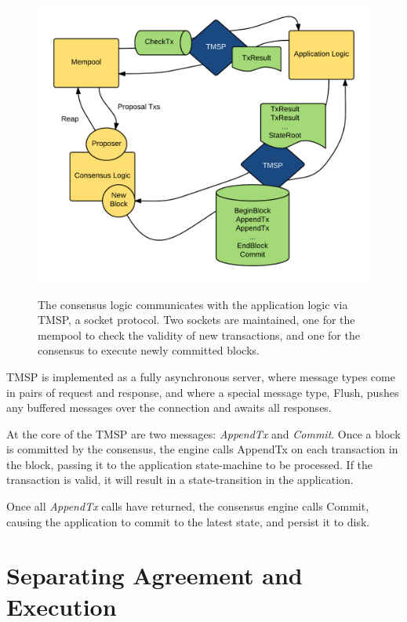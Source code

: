 \begin{figure}[]
	\includegraphics[width=\linewidth,height=\textheight,keepaspectratio]{figures/tmsp.png}
    	\centering
	\label{fig:tmsp}
	\caption[TMSP Architecture]{
The consensus logic communicates with the application logic via TMSP, a socket protocol. 
Two sockets are maintained, one for the mempool to check the validity of new transactions,
and one for the consensus to execute newly committed blocks.
}
\end{figure}

TMSP is implemented as a fully asynchronous server, 
where message types come in pairs of request and response,
and where a special message type, Flush, pushes any buffered messages over the connection and awaits all responses.

At the core of the TMSP are two messages: \emph{AppendTx} and \emph{Commit}.
Once a block is committed by the consensus, 
the engine calls AppendTx on each transaction in the block, 
passing it to the application state-machine to be processed.
If the transaction is valid, it will result in a state-transition in the application.

Once all \emph{AppendTx} calls have returned, the consensus engine calls Commit,
causing the application to commit to the latest state, and persist it to disk.

\section{Separating Agreement and Execution}

